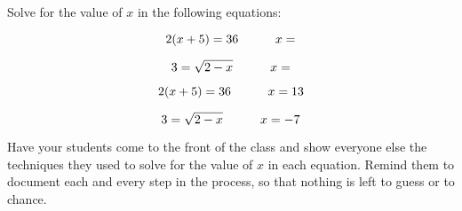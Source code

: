 

Solve for the value of $x$ in the following equations:

$$2(x + 5) = 36 \hbox{\hskip 30pt} x = $$

$$3 = \sqrt{2 - x} \hbox{\hskip 30pt} x = $$







$$2(x + 5) = 36 \hbox{\hskip 30pt} x = 13$$

$$3 = \sqrt{2 - x} \hbox{\hskip 30pt} x = -7$$







Have your students come to the front of the class and show everyone else the techniques they used to solve for the value of $x$ in each equation.  Remind them to document each and every step in the process, so that nothing is left to guess or to chance.




